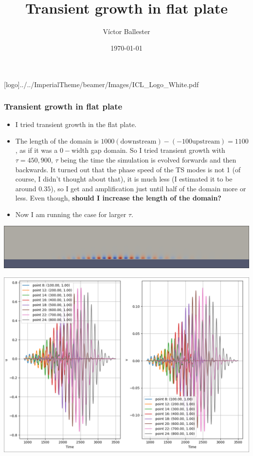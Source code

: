 \documentclass[
  aspectratio=169, %
  t, %
  onlytextwidth, %
  10pt, %
]{beamer}
\title{Transient growth in flat plate} %
\subtitle{} %
\author{Víctor Ballester} %
\date{\today} %
\def\imagefolder{../../ImperialTheme/beamer/Images}
\begin{document}
\begingroup
{} %
[logo]{\imagefolder/ICL_Logo_White.pdf} %
\frame[plain, s]{\titlepage} %
\endgroup

\begin{frame}
	\frametitle{Transient growth in flat plate}
	\begin{itemize}
		\item I tried transient growth in the flat plate.
		\item The length of the domain is $1000 (\text{downstream}) - (-100 \text{upstream}) = 1100$, as if it was a $0-$width gap domain. So I tried transient growth with $\tau = 450, 900$, $\tau$ being the time the simulation is evolved forwards and then backwards. It turned out that the phase speed of the TS modes is not 1 (of course, I didn't thought about that), it is much less (I estimated it to be around $0.35$), so I get and amplification just until half of the domain more or less. Even though, \textbf{should I increase the length of the domain?}
		\item Now I am running the case for larger $\tau$.
	\end{itemize}
	\centering
	\includegraphics[width=0.85\linewidth]{Images/ts_tg.png}
\end{frame}
\begin{frame}
	\centering
	\includegraphics[width=0.75\linewidth]{Images/ts_tg_plot.png}
\end{frame}
\end{document}
